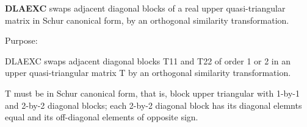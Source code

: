 {\bfseries D\+L\+A\+E\+X\+C} swaps adjacent diagonal blocks of a real upper quasi-\/triangular matrix in Schur canonical form, by an orthogonal similarity transformation. 

 \begin{DoxyParagraph}{Purpose\+: }
\begin{DoxyVerb} DLAEXC swaps adjacent diagonal blocks T11 and T22 of order 1 or 2 in
 an upper quasi-triangular matrix T by an orthogonal similarity
 transformation.

 T must be in Schur canonical form, that is, block upper triangular
 with 1-by-1 and 2-by-2 diagonal blocks; each 2-by-2 diagonal block
 has its diagonal elemnts equal and its off-diagonal elements of
 opposite sign.\end{DoxyVerb}
 
\end{DoxyParagraph}

